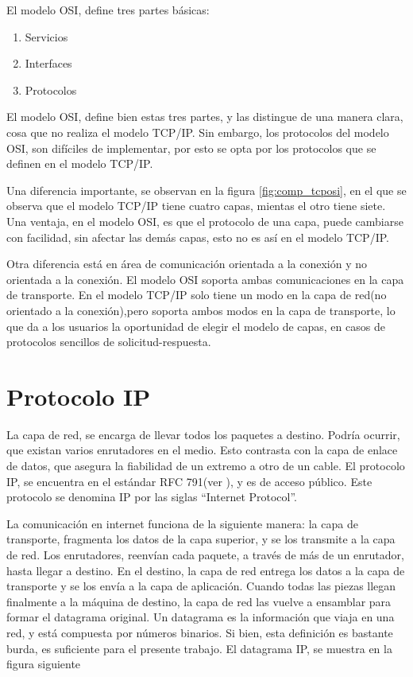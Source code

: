 El modelo OSI, define tres partes básicas: 
\begin{enumerate}
	\item Servicios 
	\item Interfaces 
	\item Protocolos
\end{enumerate}

El modelo OSI, define bien estas tres partes, y las distingue de una manera clara, cosa que no realiza el modelo TCP/IP. Sin embargo, los protocolos del modelo OSI, son difíciles de implementar, por esto se opta por los protocolos que se definen en el modelo TCP/IP. 

Una diferencia importante, se observan en la figura \ref{fig:comp_tcposi}, en el que se observa que el modelo TCP/IP tiene cuatro capas, mientas el otro tiene siete. Una ventaja, en el modelo OSI, es que el protocolo de una capa, puede cambiarse con facilidad, sin afectar las demás capas, esto no es así en el modelo TCP/IP. 

Otra diferencia está en área de comunicación orientada a la conexión y no orientada a la conexión. El modelo OSI soporta ambas comunicaciones en la capa de transporte. En el  modelo TCP/IP solo tiene un modo en la capa de red(no orientado a la conexión),pero soporta ambos modos en la capa de transporte, lo que da a los usuarios la oportunidad de elegir el modelo de capas, en casos de protocolos sencillos de solicitud-respuesta.  




\section{Protocolo IP} 
La capa de red, se encarga de llevar todos los paquetes a destino. Podría ocurrir, que existan varios enrutadores en el medio. Esto contrasta con la capa de enlace de datos, que asegura la fiabilidad de un extremo a otro de un cable. El protocolo IP, se encuentra en el estándar RFC 791(ver \cite{RFCIP}), y es de acceso público. Este protocolo se denomina IP por las siglas ``Internet Protocol''. 

La comunicación en internet funciona de la siguiente manera: la capa de transporte, fragmenta los datos de la capa superior, y se los transmite a la capa de red. Los enrutadores, reenvían cada paquete, a través de más de un enrutador, hasta llegar a destino. En el destino, la capa de red entrega los datos a la capa de transporte y se los envía a la capa de aplicación. Cuando todas las piezas llegan finalmente a la máquina de destino, la capa de red las vuelve a ensamblar para formar el datagrama original. Un datagrama es la información que viaja en una red, y está compuesta por números binarios. Si bien, esta definición es bastante burda, es suficiente para el presente trabajo. El datagrama IP, se muestra en la figura siguiente 

